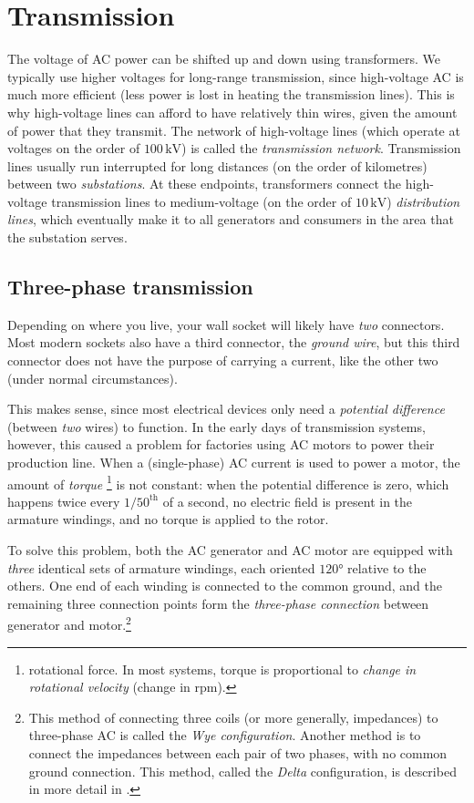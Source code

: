 \documentclass[main.tex]{subfiles}
\begin{document}
\section{Transmission}
The voltage of AC power can be shifted up and down using transformers. We typically use higher voltages for long-range transmission, since high-voltage AC is much more efficient (less power is lost in heating the transmission lines). This is why high-voltage lines can afford to have relatively thin wires, given the amount of power that they transmit. The network of high-voltage lines (which operate at voltages on the order of $100 \, \si{\kilo\volt}$) is called the \emph{transmission network}. Transmission lines usually run interrupted for long distances (on the order of kilometres) between two \emph{substations}. At these endpoints, transformers connect the high-voltage transmission lines to medium-voltage (on the order of $10 \, \si{\kilo\volt}$) \emph{distribution lines}, which eventually make it to all generators and consumers in the area that the substation serves.

\subsection{Three-phase transmission}\label{sec:threephase}
Depending on where you live, your wall socket will likely have \emph{two} connectors. Most modern sockets also have a third connector, the \emph{ground wire}, but this third connector does not have the purpose of carrying a current, like the other two (under normal circumstances).

This makes sense, since most electrical devices only need a \emph{potential difference} (between \emph{two} wires) to function. In the early days of transmission systems, however, this caused a problem for factories using AC motors to power their production line. When a (single-phase) AC current is used to power a motor, the amount of \emph{torque}
\footnote{\ie rotational force. In most systems, torque is proportional to \emph{change in rotational velocity} (change in rpm).}
is not constant: when the potential difference is zero, which happens twice every $1/50^{\text{th}}$ of a second, no electric field is present in the armature windings, and no torque is applied to the rotor.

To solve this problem, both the AC generator and AC motor are equipped with \emph{three} identical sets of armature windings, each oriented $120 \si{\degree}$ relative to the others. One end of each winding is connected to the common ground, and the remaining three connection points form the \emph{three-phase connection} between generator and motor.\footnote{This method of connecting three coils (or more generally, impedances) to three-phase AC is called the \emph{Wye configuration}. Another method is to connect the impedances between each pair of two phases, with no common ground connection. This method, called the \emph{Delta} configuration, is described in more detail in \cite{VonMeier2006}.}
\end{document}
